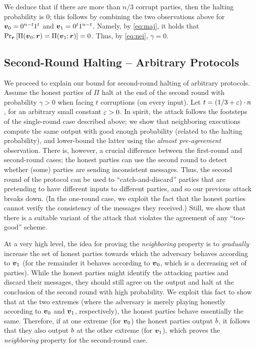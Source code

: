We deduce that if there are more than $n/3$ corrupt parties, then the halting probability is $0$; this follows by combining the two observations above for ${ \boldsymbol{v}}_0=0^{n-t}1^{t}$ and ${ \boldsymbol{v}}_1=0^{t}1^{n-t}$. Namely, by \cref{eq:maj}, it holds that $\Pr_{{ \boldsymbol{r}}}\left[\Pi({ \boldsymbol{v}}_0;{ \boldsymbol{r}})=\Pi({ \boldsymbol{v}}_1;{ \boldsymbol{r}})\right]=0$. Thus, by \cref{eq:nei}, $\gamma=0$.

\subsection{Second-Round Halting -- Arbitrary Protocols}\label{sec:technique:2}

We proceed to explain our bound for second-round halting of arbitrary protocols. Assume the honest parties of $\Pi$ halt at the end of the second round with probability $\gamma>0$ when facing $t$ corruptions (on every input). Let $t=(1/3+\varepsilon)\cdot n$, for an arbitrary small constant $\varepsilon>0$. In spirit, the attack follows the footsteps of the single-round case described above; we show that neighboring executions compute the same output with good enough probability (related to the halting probability), and lower-bound the latter using the \emph{almost pre-agreement}
observation. There is, however, a crucial difference between the first-round and second-round cases; the honest parties can use the second round to detect whether (some) parties are sending inconsistent messages. Thus, the second round of the protocol can be used to ``catch-and-discard'' parties that are pretending to have different inputs to different parties, and so our previous attack breaks down. (In the one-round case, we exploit the fact that the honest parties cannot verify the consistency of the messages they received.) Still, we show that there is a suitable variant of the attack that violates the agreement of any ``too-good'' scheme.

At a very high level, the idea for proving the \emph{neighboring} property is to \emph{gradually} increase the set of honest parties towards which the adversary behaves according to ${ \boldsymbol{v}}_1$ (for the remainder it behaves according to ${ \boldsymbol{v}}_0$, which is a decreasing set of parties). While the honest parties might identify the attacking parties and discard their messages, they should still agree on the output and halt at the conclusion of the second round with high probability. We exploit this fact to show that at the two extremes (where the adversary is merely playing honestly according to ${ \boldsymbol{v}}_0$ and ${ \boldsymbol{v}}_1$, respectively), the honest parties behave essentially the same. Therefore, if at one extreme (for ${ \boldsymbol{v}}_0$) the honest parties output $b$, it follows that they also output $b$ at the other extreme (for ${ \boldsymbol{v}}_1$), which proves the \emph{neighboring} property for the second-round case.


